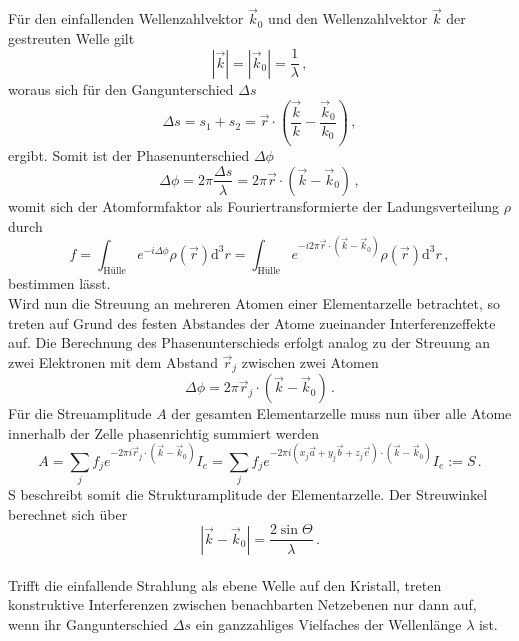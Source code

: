 Für den einfallenden Wellenzahlvektor $\vec{k}_0$ und den Wellenzahlvektor $\vec{k}$ der gestreuten Welle gilt
\begin{equation*}
    |\vec{k}| = |\vec{k}_0| = \frac{1}{\lambda}\,,
\end{equation*}
woraus sich für den Gangunterschied $\Delta s$
\begin{equation*}
    \Delta s = s_1 + s_2 = \vec{r} \cdot \left(\frac{\vec{k}}{k} - \frac{\vec{k}_0}{k_0}\right)\,,
\end{equation*}
ergibt.
Somit ist der Phasenunterschied $\Delta \phi$
\begin{equation*}
    \Delta \phi = 2 \pi \frac{\Delta s}{\lambda} = 2 \pi \vec{r} \cdot \left(\vec{k} - \vec{k}_0\right)\,,
\end{equation*}
womit sich der Atomformfaktor als Fouriertransformierte der Ladungsverteilung $\rho$ durch
\begin{equation*}
    f = \int_\text{Hülle} e^{-i \Delta \phi} \rho(\vec{r}) \mathrm{d}^3r = \int_\text{Hülle} e^{-i 2 \pi \vec{r} \cdot \left(\vec{k} - \vec{k}_0\right)} \rho(\vec{r}) \mathrm{d}^3r\,,
\end{equation*}
bestimmen lässt.
\\
Wird nun die Streuung an mehreren Atomen einer Elementarzelle betrachtet, so treten auf Grund des festen Abstandes der Atome zueinander Interferenzeffekte auf.
Die Berechnung des Phasenunterschieds erfolgt analog zu der Streuung an zwei Elektronen mit dem Abstand $\vec{r}_j$ zwischen zwei Atomen
\begin{equation*}
    \Delta \phi = 2 \pi \vec{r}_j \cdot \left(\vec{k} - \vec{k}_0\right)\,.
\end{equation*}
Für die Streuamplitude $A$ der gesamten Elementarzelle muss nun über alle Atome innerhalb der Zelle phasenrichtig summiert werden
\begin{equation*}
    A = \sum_j f_j e^{-2 \pi i \vec{r}_j \cdot \left(\vec{k} - \vec{k}_0\right)} I_e = \sum_j f_j e^{-2 \pi i \left(x_j\vec{a} + y_j\vec{b} + z_j\vec{c}\right) \cdot \left(\vec{k} - \vec{k}_0\right)} I_e := S\,.
\end{equation*}
S beschreibt somit die Strukturamplitude der Elementarzelle.
Der Streuwinkel berechnet sich über
\begin{equation*}
    |\vec{k} - \vec{k}_0| = \frac{2 \sin{\Theta}}{\lambda}\,.
\end{equation*}
\\
Trifft die einfallende Strahlung als ebene Welle auf den Kristall, treten konstruktive Interferenzen zwischen benachbarten Netzebenen nur dann auf, wenn ihr Gangunterschied $\Delta s$ ein ganzzahliges Vielfaches der Wellenlänge $\lambda$ ist.
